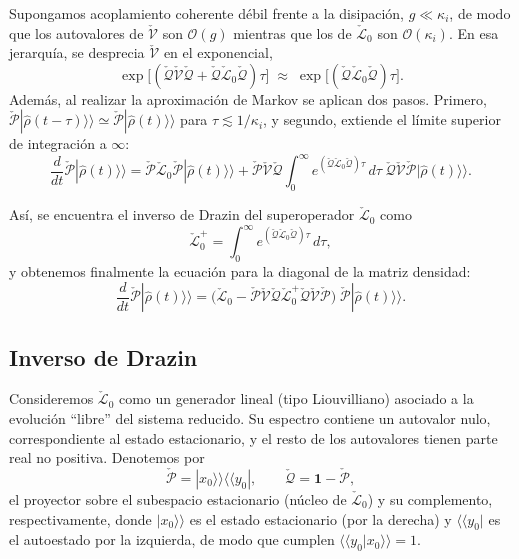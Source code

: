 \begin{appendixs}
Supongamos acoplamiento coherente débil frente a la disipación,
$g\ll \kappa_i$, de modo que los autovalores de
$\check{\mathcal{V}}$ son $\mathcal{O}(g)$ mientras que los de
$\check{\mathcal{L}}_{0}$ son $\mathcal{O}(\kappa_i)$. En esa jerarquía,
se desprecia $\check{\mathcal{V}}$ en el exponencial,
\[
\exp\!\big[(\check{\mathcal{Q}}\check{\mathcal{V}}\check{\mathcal{Q}}
+\check{\mathcal{Q}}\check{\mathcal{L}}_{0}\check{\mathcal{Q}})\tau\big]
\;\approx\;
\exp\!\big[(\check{\mathcal{Q}}\check{\mathcal{L}}_{0}\check{\mathcal{Q}})\tau\big].
\]
Además, al realizar la aproximación de Markov se aplican dos pasos. Primero,
$\check{\mathcal{P}}|\hat{\rho}(t-\tau)\rangle\rangle\simeq
\check{\mathcal{P}}|\hat{\rho}(t)\rangle\rangle$ para $\tau\lesssim 1/\kappa_i$,
y segundo, extiende el límite superior de integración a $\infty$:
\begin{equation*}
    \frac{d}{dt}\check{\mathcal{P}}|\hat{\rho}(t)\rangle\rangle
    =\check{\mathcal{P}}\check{\mathcal{L}}_{0}\check{\mathcal{P}}|\hat{\rho}(t)\rangle\rangle
     +\check{\mathcal{P}}\check{\mathcal{V}}\check{\mathcal{Q}}
      \int_{0}^{\infty}\!e^{(\check{\mathcal{Q}}\check{\mathcal{L}}_{0}\check{\mathcal{Q}})\tau}\,d\tau\;
      \check{\mathcal{Q}}\check{\mathcal{V}}\check{\mathcal{P}}
      |\hat{\rho}(t)\rangle\rangle .
\end{equation*}

Así, se encuentra el inverso de Drazin del superoperador $\check{\mathcal{L}}_{0}$ como
\[
\check{\mathcal{L}}_{0}^{+}
=\int_{0}^{\infty}\!e^{(\check{\mathcal{Q}}\check{\mathcal{L}}_{0}\check{\mathcal{Q}})\tau}\,d\tau,
\]
y obtenemos finalmente la ecuación para la diagonal de la matriz densidad:
\begin{equation*}
    \frac{d}{dt}\check{\mathcal{P}}|\hat{\rho}(t)\rangle\rangle
    =\big(\check{\mathcal{L}}_{0}
      -\check{\mathcal{P}}\check{\mathcal{V}}\check{\mathcal{Q}}
       \check{\mathcal{L}}_{0}^{+}\check{\mathcal{Q}}\check{\mathcal{V}}\check{\mathcal{P}}\big)\;
      \check{\mathcal{P}}|\hat{\rho}(t)\rangle\rangle .
\end{equation*}

\label{appendix5clasic}

\subsection{Inverso de Drazin}
Consideremos $\check{\mathcal{L}}_{0}$ como un generador lineal (tipo Liouvilliano) asociado a la evolución
``libre'' del sistema reducido. Su espectro contiene un autovalor nulo, correspondiente al estado
estacionario, y el resto de los autovalores tienen parte real no positiva. Denotemos por
\[
\check{\mathcal{P}} = |x_{0}\rangle\rangle\langle\langle y_{0}|, \qquad
\check{\mathcal{Q}} = \mathbf{1}-\check{\mathcal{P}},
\]
el proyector sobre el subespacio estacionario (núcleo de $\check{\mathcal{L}}_{0}$) y su complemento,
respectivamente, donde $|x_{0}\rangle\rangle$ es el estado estacionario (por la derecha) y
$\langle\langle y_{0}|$ es el autoestado por la izquierda, de modo que cumplen
$\langle\langle y_{0}|x_{0}\rangle\rangle=1$.
\\


\end{appendixs}
